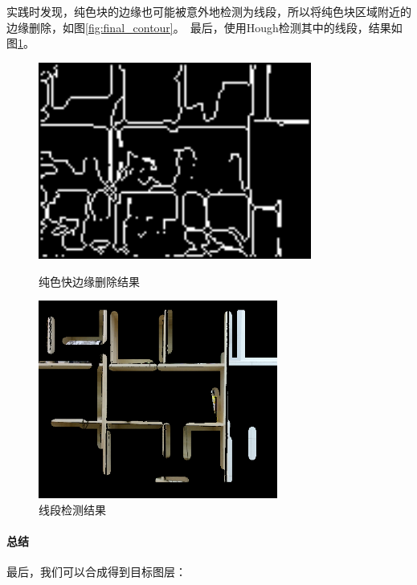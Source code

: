 实践时发现，纯色块的边缘也可能被意外地检测为线段，所以将纯色块区域附近的边缘删除，如图\ref{fig:final_contour}。\ 最后，使用Hough检测其中的线段，结果如图\ref{fig:lines}。\ 

\begin{figure}[H]
\begin{minipage}[t]{0.5\textwidth}
	\centering
    \includegraphics[width = 0.8\textwidth]{images/final_contour.png}
    \caption{纯色快边缘删除结果}
    \label{fig:final_contour}
\end{minipage}
\begin{minipage}[t]{0.5\textwidth}
	\centering
    \includegraphics[width = 0.7\textwidth]{images/lines.png}
    \caption{线段检测结果}
    \label{fig:lines}
\end{minipage}
\end{figure}
    
\paragraph{总结}

最后，我们可以合成得到目标图层：

